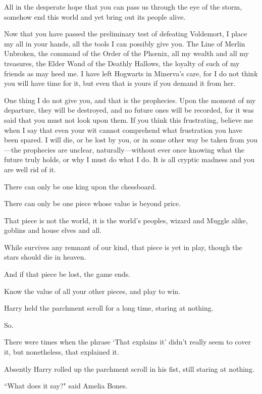 \begin{writtenNote}
All in the desperate hope that you can pass us through the eye of the storm, somehow end this world and yet bring out its people alive.

Now that you have passed the preliminary test of defeating Voldemort, I place my all in your hands, all the tools I can possibly give you. The Line of Merlin Unbroken, the command of the Order of the Phœnix, all my wealth and all my treasures, the Elder Wand of the Deathly Hallows, the loyalty of such of my friends as may heed me. I have left Hogwarts in Minerva's care, for I do not think you will have time for it, but even that is yours if you demand it from her.

One thing I do not give you, and that is the prophecies. Upon the moment of my departure, they will be destroyed, and no future ones will be recorded, for it was said that you must not look upon them. If you think this frustrating, believe me when I say that even your wit cannot comprehend what frustration you have been spared. I will die, or be lost by you, or in some other way be taken from you—the prophecies are unclear, naturally—without ever once knowing what the future truly holds, or why I must do what I do. It is all cryptic madness and you are well rid of it.

There can only be one king upon the chessboard.

There can only be one piece whose value is beyond price.

That piece is not the world, it is the world's peoples, wizard and Muggle alike, goblins and house elves and all.

While survives any remnant of our kind, that piece is yet in play, though the stars should die in heaven.

And if that piece be lost, the game ends.

Know the value of all your other pieces, and play to win.

\end{writtenNote}

\later

Harry held the parchment scroll for a long time, staring at nothing.

So.

There were times when the phrase `That explains it' didn't really seem to cover it, but nonetheless, that explained it.

Absently Harry rolled up the parchment scroll in his fist, still staring at nothing.

``What does it say?" said Amelia Bones.


